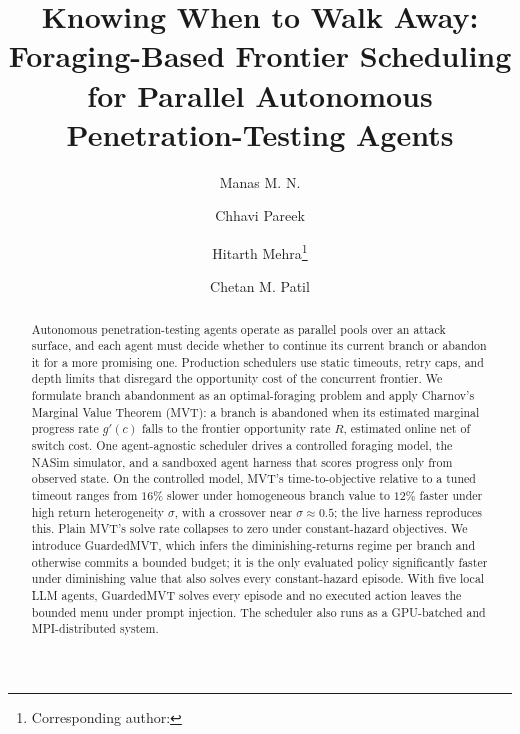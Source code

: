 \documentclass[runningheads]{llncs}
\newif\ifanon
\begin{document}
\title{Knowing When to Walk Away: Foraging-Based
Frontier Scheduling for Parallel Autonomous
Penetration-Testing Agents}


\ifanon
  \author{Anonymous Author(s)}
  \authorrunning{Anonymous}
  \institute{Affiliation withheld for double-blind review}
\else
  \author{Manas M. N. \and Chhavi Pareek \and Hitarth Mehra\thanks{Corresponding author:
    } \and Chetan M. Patil}
\fi

\maketitle

\begin{abstract}
Autonomous penetration-testing agents operate as parallel pools over an
attack surface, and each agent must decide whether to continue its current
branch or abandon it for a more promising one. Production schedulers use
static timeouts, retry caps, and depth limits that disregard the
opportunity cost of the concurrent frontier. We formulate branch abandonment as an
optimal-foraging problem and apply Charnov's Marginal Value Theorem (MVT): a branch is
abandoned when its estimated marginal progress rate $g'(c)$ falls to the frontier
opportunity rate $R$, estimated online net of switch cost.
One agent-agnostic scheduler drives a controlled foraging model, the NASim simulator, and
a sandboxed agent harness that scores progress only from observed state. On the
controlled model, MVT's time-to-objective relative to a tuned timeout
ranges from $16\%$ slower under homogeneous branch value to $12\%$ faster under high
return heterogeneity $\sigma$, with a crossover near $\sigma\approx0.5$; the live harness
reproduces this. Plain MVT's solve rate collapses to zero under constant-hazard
objectives. We introduce GuardedMVT, which infers the diminishing-returns regime
per branch and otherwise commits a bounded budget; it is the only evaluated policy
significantly faster under diminishing value that also solves every constant-hazard
episode. With five local LLM agents, GuardedMVT solves every episode and no executed
action leaves the bounded menu under prompt injection. The scheduler also runs as a
GPU-batched and MPI-distributed system.

\end{abstract}
\end{document}
